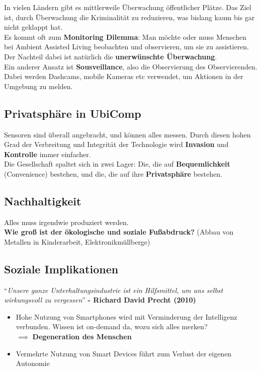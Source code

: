 \documentclass[a4paper]{article}
\begin{document}
In vielen Ländern gibt es mittlerweile Überwachung öffentlicher Plätze. Das Ziel ist, durch Überwachung die Kriminalität zu reduzieren, was bislang kaum bis gar nicht geklappt hat. \\

Es kommt oft zum \textbf{Monitoring Dilemma}: Man möchte oder muss Menschen bei Ambient Assisted Living beobachten und observieren, um sie zu assistieren. Der Nachteil dabei ist natürlich die \textbf{unerwünschte Überwachung}.\\
Ein anderer Ansatz ist \textbf{Sousveillance}, also die Observierung des Observierenden. Dabei werden Dashcams, mobile Kameras etc verwendet, um Aktionen in der Umgebung zu melden.

\subsection{Privatsphäre in UbiComp}
Sensoren sind überall angebracht, und können alles messen. Durch diesen hohen Grad der Verbreitung und Integrität der Technologie wird \textbf{Invasion} und \textbf{Kontrolle} immer einfacher. \\

Die Gesellschaft spaltet sich in zwei Lager: Die, die auf \textbf{Bequemlichkeit} (Convenience) bestehen, und die, die auf ihre \textbf{Privatsphäre} bestehen.

\subsection{Nachhaltigkeit}
Alles muss irgendwie produziert werden.\\
 \textbf{Wie groß ist der ökologische und soziale Fußabdruck?} (Abbau von Metallen in Kinderarbeit, Elektronikmüllberge) 
 
 \subsection{Soziale Implikationen}
 ``\textit{Unsere ganze Unterhaltungsindustrie ist ein Hilfsmittel, um uns selbst wirkungsvoll zu vergessen}'' \textbf{- Richard David Precht (2010)}\\
 
 \begin{itemize}
 	\item Hohe Nutzung von Smartphones wird mit Verminderung der Intelligenz verbunden. Wissen ist on-demand da, wozu sich alles merken?\\
 	$\implies$ \textbf{Degeneration des Menschen}
 	\item Vermehrte Nutzung von Smart Devices führt zum Verlust der eigenen Autonomie
 \end{itemize}
\end{document}
